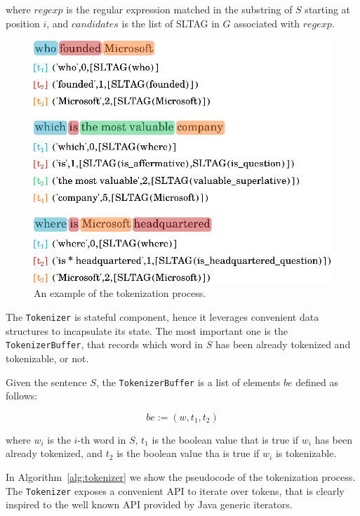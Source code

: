 where
$regexp$ is the regular expression matched in the substring of $S$ starting at position $i$, and
$candidates$ is the list of SLTAG in $G$ associated with $regexp$.

\begin{figure}[tp]
	\centering
	\includegraphics{./fig/tokenizer-sample}
	\caption{An example of the tokenization process.}
	\label{fig:tokenizer-sample}
\end{figure}

The \texttt{Tokenizer} is stateful component, hence it leverages convenient data structures to incapsulate its state.
%
The most important one is the \texttt{TokenizerBuffer}, that records which word in $S$ has been already tokenized and tokenizable, or not.

Given the sentence $S$, the \texttt{TokenizerBuffer} is a list of elements $be$ defined as follows:

\begin{equation}
\label{eqn:tokenizer-buffer-element}
	be:=(w, t_{1}, t_{2})
\end{equation}

where 
$w_{i}$ is the $i$-th word in $S$, 
$t_{1}$ is the boolean value that is true if $w_{i}$ has been already tokenized, and
$t_{2}$ is the boolean value tha is true if $w_{i}$ is tokenizable.


In Algorithm~\ref{alg:tokenizer} we show the pseudocode of the tokenization process.
%
The \texttt{Tokenizer} exposes a convenient API to iterate over tokens, that is clearly inspired to the well known API provided by Java generic iterators.

